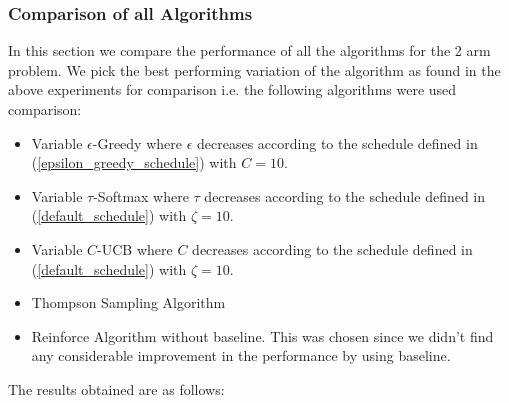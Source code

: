 \documentclass{article}
\begin{document}
		\subsubsection{Comparison of all Algorithms}
		\label{2_bernoulli_comparison}
		In this section we compare the performance of all the algorithms for the 2 arm problem. We pick the best performing variation of the algorithm as found
		in the above experiments for comparison i.e. the following algorithms were used comparison:
		\begin{itemize}
			\item Variable $\epsilon$-Greedy where $\epsilon$ decreases according to the schedule defined in (\ref{epsilon_greedy_schedule}) with $C=10$.
			\item Variable $\tau$-Softmax where $\tau$ decreases according to the schedule defined in (\ref{default_schedule}) with $\zeta=10$.
			\item Variable $C$-UCB where $C$ decreases according to the schedule defined in (\ref{default_schedule}) with $\zeta=10$.
			\item Thompson Sampling Algorithm
			\item Reinforce Algorithm without baseline. This was chosen since we didn't find any considerable improvement in the performance by using baseline.
		\end{itemize}
		
		The results obtained are as follows:
		
\end{document}
